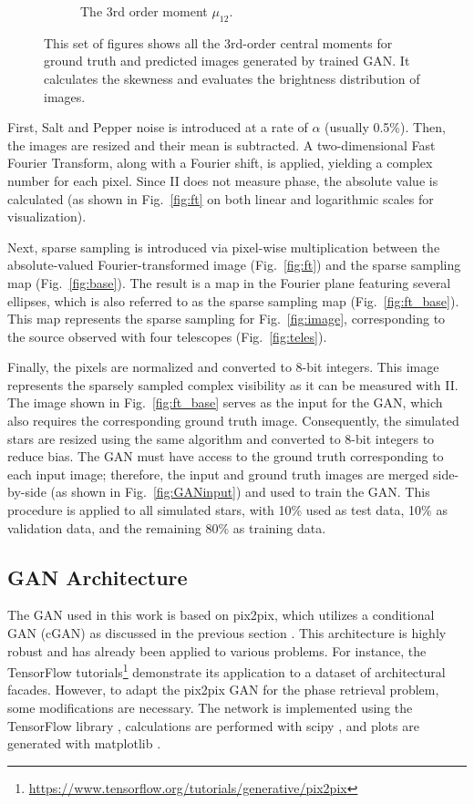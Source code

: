 \documentclass[fleqn,usenatbib,twocolumn]{mnras}
\begin{document}
\begin{figure}
\begin{subfigure}{0.50\linewidth}
		\caption{The 3rd order moment $\mu_{12}$.}
		\label{fig:mom10}
	\end{subfigure}\hfill
	\caption{This set of figures shows all the 3rd-order central moments for ground truth and predicted images generated by trained GAN. It calculates the skewness and evaluates the brightness distribution of images.}
	\label{fig:moments}
\end{figure}



First, Salt and Pepper noise is introduced at a rate of \(\alpha\) (usually 0.5\%). Then, the images are resized and their mean is subtracted. A two-dimensional Fast Fourier Transform, along with a Fourier shift, is applied, yielding a complex number for each pixel. Since II does not measure phase, the absolute value is calculated (as shown in Fig.~\ref{fig:ft} on both linear and logarithmic scales for visualization). 

Next, sparse sampling is introduced via pixel-wise multiplication between the absolute-valued Fourier-transformed image (Fig.~\ref{fig:ft}) and the sparse sampling map (Fig.~\ref{fig:base}). The result is a map in the Fourier plane featuring several ellipses, which is also referred to as the sparse sampling map (Fig.~\ref{fig:ft_base}). This map represents the sparse sampling for Fig.~\ref{fig:image}, corresponding to the source observed with four telescopes (Fig.~\ref{fig:teles}). 

Finally, the pixels are normalized and converted to 8-bit integers. This image represents the sparsely sampled complex visibility as it can be measured with II. The image shown in Fig.~\ref{fig:ft_base} serves as the input for the GAN, which also requires the corresponding ground truth image. Consequently, the simulated stars are resized using the same algorithm and converted to 8-bit integers to reduce bias. The GAN must have access to the ground truth corresponding to each input image; therefore, the input and ground truth images are merged side-by-side (as shown in Fig.~\ref{fig:GANinput}) and used to train the GAN. This procedure is applied to all simulated stars, with 10\% used as test data, 10\% as validation data, and the remaining 80\% as training data.


\subsection{GAN Architecture}
The GAN used in this work is based on pix2pix, which utilizes a conditional GAN (cGAN) as discussed in the previous section \cite{isola2017image}. This architecture is highly robust and has already been applied to various problems. For instance, the TensorFlow tutorials\footnote{\url{https://www.tensorflow.org/tutorials/generative/pix2pix}} demonstrate its application to a dataset of architectural facades. However, to adapt the pix2pix GAN for the phase retrieval problem, some modifications are necessary. The network is implemented using the TensorFlow library \cite{abadi2016tensorflow}, calculations are performed with scipy \cite{virtanen2020scipy}, and plots are generated with matplotlib \cite{4160265}.
\end{document}
